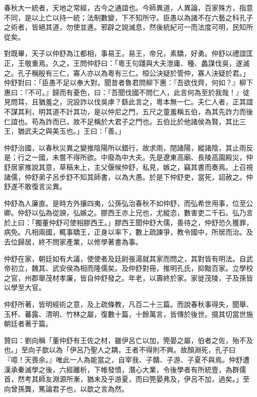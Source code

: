\begin{pinyinscope}
春秋大一統者，天地之常經，古今之通誼也。今師異道，人異論，百家殊方，指意不同，是以上亡以持一統；法制數變，下不知所守。臣愚以為諸不在六藝之科孔子之術者，皆絕其道，勿使並進。邪辟之說滅息，然後統紀可一而法度可明，民知所從矣。

對既畢，天子以仲舒為江都相，事易王。易王，帝兄，素驕，好勇。仲舒以禮誼匡正，王敬重焉。久之，王問仲舒曰：「粵王句踐與大夫泄庸、種、蠡謀伐吳，遂滅之。孔子稱殷有三仁，寡人亦以為粵有三仁。桓公決疑於管仲，寡人決疑於君。」仲舒對曰：「臣愚不足以奉大對。聞昔者魯君問柳下惠：『吾欲伐齊，何如？』柳下惠曰：『不可。』歸而有憂色，曰：『吾聞伐國不問仁人，此言何為至於我哉！』徒見問耳，且猶羞之，況設詐以伐吳虖？繇此言之，粵本無一仁。夫仁人者，正其誼不謀其利，明其道不計其功，是以仲尼之門，五尺之童羞稱五伯，為其先詐力而後仁誼也。苟為詐而已，故不足稱於大君子之門也。五伯比於他諸侯為賢，其比三王，猶武夫之與美玉也。」王曰：「善。」

仲舒治國，以春秋災異之變推陰陽所以錯行，故求雨，閉諸陽，縱諸陰，其止雨反是；行之一國，未嘗不得所欲。中廢為中大夫。先是遼東高廟、長陵高園殿災，仲舒居家推說其意，草稿未上，主父偃候仲舒，私見，嫉之，竊其書而奏焉。上召視諸儒，仲舒弟子呂步舒不知其師書，以為大愚。於是下仲舒吏，當死，詔赦之。仲舒遂不敢復言災異。

仲舒為人廉直。是時方外攘四夷，公孫弘治春秋不如仲舒，而弘希世用事，位至公卿。仲舒以弘為從諛，弘嫉之。膠西王亦上兄也，尤縱恣，數害吏二千石。弘乃言於上曰：「獨董仲舒可使相膠西王。」膠西王聞仲舒大儒，善待之，仲舒恐久獲罪，病免。凡相兩國，輒事驕王，正身以率下，數上疏諫爭，教令國中，所居而治。及去位歸居，終不問家產業，以修學著書為事。

仲舒在家，朝廷如有大議，使使者及廷尉張湯就其家而問之，其對皆有明法。自武帝初立，魏其、武安侯為相而隆儒矣。及仲舒對冊，推明孔氏，抑黜百家。立學校之官，州郡舉茂材孝廉，皆自仲舒發之。年老，以壽終於家。家徙茂陵，子及孫皆以學至大官。

仲舒所著，皆明經術之意，及上疏條教，凡百二十三篇。而說春秋事得失，聞舉、玉杯、蕃露、清明、竹林之屬，復數十篇，十餘萬言，皆傳於後世。掇其切當世施朝廷者著于篇。

贊曰：劉向稱「董仲舒有王佐之材，雖伊呂亡以加，筦晏之屬，伯者之佐，殆不及也。」至向子歆以為「伊呂乃聖人之耦，王者不得則不興。故顏淵死，孔子曰『噫！天喪余。』唯此一人為能當之，自宰我、子贛、子游、子夏不與焉。仲舒遭漢承秦滅學之後，六經離析，下帷發憤，潛心大業，令後學者有所統壹，為群儒首，然考其師友淵源所漸，猶未及乎游夏，而曰筦晏弗及，伊呂不加，過矣。」至向曾孫龔，篤論君子也，以歆之言為然。


\end{pinyinscope}
